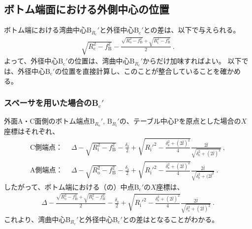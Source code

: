 \subsection{ボトム端面における外側中心の位置}
ボトム端における湾曲中心B$_{R_\mathrm c}'$と外径中心B$_\mathrm c'$との差は、以下で与えられる。
\begin{align}
  \label{eq:BRc-Bc}
  \sqrt{R_\mathrm c^2-f_\mathrm B^2}
  -\frac{\sqrt{R_\mathrm o^2-f_\mathrm B^2}+\sqrt{R_\mathrm i^2-f_\mathrm B^2}}2\ .
\end{align}
よって、外径中心B$_\mathrm c'$の位置は、湾曲中心B$_{R_\mathrm c}'$からだけ加味すればよい。
以下では、外径中心B$_\mathrm c'$の位置を直接計算し、このことが整合していることを確かめる。

\subsubsection{スペーサを用いた場合のB\texorpdfstring{$_\mathrm c'$}{c'}}
外面A・C面側のボトム端点B$_{R_\mathrm o}'$, B$_{R_\mathrm i}'$の、テーブル中心Pを原点とした場合の$X$座標はそれぞれ、
\begin{align*}
  \text{C側端点：}&~~
  \Delta-\sqrt{R_\mathrm i^2-f_\mathrm B^2}-\frac{\delta_\mathrm s}2+\sqrt{R_\mathrm i'^2-\frac{\delta_\mathrm s^2+(2\bar l)^2}4}\frac{2\bar l}{\sqrt{\delta_\mathrm s^2+(2\bar l)^2}}\ ,\\
  \text{A側端点：}&~~
  \Delta-\sqrt{R_\mathrm o^2-f_\mathrm B^2}-\frac{\delta_\mathrm s}2+\sqrt{R_\mathrm i'^2-\frac{\delta_\mathrm s^2+(2\bar l)^2}4}\frac{2\bar l}{\sqrt{\delta_\mathrm s^2+(2\bar l^2}}\ .
\end{align*}
したがって、ボトム端における（\ACOD の）中点B$_\mathrm c'$の$X$座標は、
\begin{align}
  \label{eq:spacerBc}
  \Delta-\frac{\sqrt{R_\mathrm o^2-f_\mathrm B^2}+\sqrt{R_\mathrm i^2-f_\mathrm B^2}}2
  -\frac{\delta_\mathrm s}2+\sqrt{R_\mathrm i'^2-\frac{\delta_\mathrm s^2+(2\bar l)^2}4}\frac{2\bar l}{\sqrt{\delta_\mathrm s^2+(2\bar l)^2}}\ .
\end{align}
これより、湾曲中心B$_{R_\mathrm c}'$と外径中心B$_\mathrm c'$との差はとなることがわかる。

